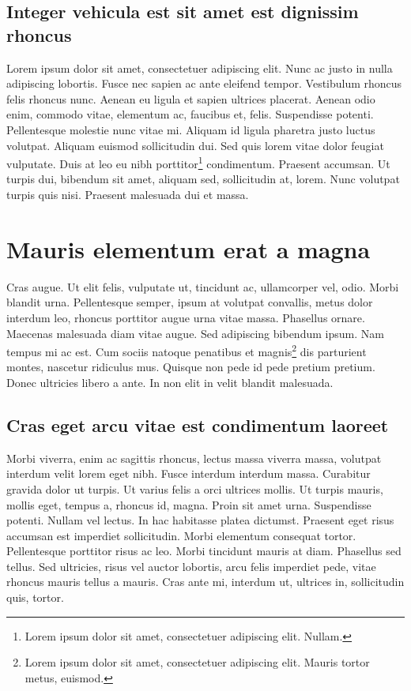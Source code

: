 \section{Integer vehicula est sit amet est dignissim rhoncus}
Lorem ipsum dolor sit amet, consectetuer adipiscing elit. Nunc ac justo in nulla adipiscing lobortis. Fusce nec sapien ac ante eleifend tempor. Vestibulum rhoncus felis rhoncus nunc. Aenean eu ligula et sapien ultrices placerat. Aenean odio enim, commodo vitae, elementum ac, faucibus et, felis. Suspendisse potenti. Pellentesque molestie nunc vitae mi. Aliquam id ligula pharetra justo luctus volutpat. Aliquam euismod sollicitudin dui. Sed quis lorem vitae dolor feugiat vulputate. Duis at leo eu nibh porttitor\footnote{Lorem ipsum dolor sit amet, consectetuer adipiscing elit. Nullam.} condimentum. Praesent accumsan. Ut turpis dui, bibendum sit amet, aliquam sed, sollicitudin at, lorem. Nunc volutpat turpis quis nisi. Praesent malesuada dui et massa.



\chapter{Mauris elementum erat a magna}
Cras augue. Ut elit felis, vulputate ut, tincidunt ac, ullamcorper vel, odio. Morbi blandit urna. Pellentesque semper, ipsum at volutpat convallis, metus dolor interdum leo, rhoncus porttitor augue urna vitae massa. Phasellus ornare. Maecenas malesuada diam vitae augue. Sed adipiscing bibendum ipsum. Nam tempus mi ac est. Cum sociis natoque penatibus et magnis\footnote{Lorem ipsum dolor sit amet, consectetuer adipiscing elit. Mauris tortor metus, euismod.} dis parturient montes, nascetur ridiculus mus. Quisque non pede id pede pretium pretium. Donec ultricies libero a ante. In non elit in velit blandit malesuada.

\section{Cras eget arcu vitae est condimentum laoreet}
Morbi viverra, enim ac sagittis rhoncus, lectus massa viverra massa, volutpat interdum velit lorem eget nibh. Fusce interdum interdum massa. Curabitur gravida dolor ut turpis. Ut varius felis a orci ultrices mollis. Ut turpis mauris, mollis eget, tempus a, rhoncus id, magna. Proin sit amet urna. Suspendisse potenti. Nullam vel lectus. In hac habitasse platea dictumst. Praesent eget risus accumsan est imperdiet sollicitudin. Morbi elementum consequat tortor. Pellentesque porttitor risus ac leo. Morbi tincidunt mauris at diam. Phasellus sed tellus. Sed ultricies, risus vel auctor lobortis, arcu felis imperdiet pede, vitae rhoncus mauris tellus a mauris. Cras ante mi, interdum ut, ultrices in, sollicitudin quis, tortor.


